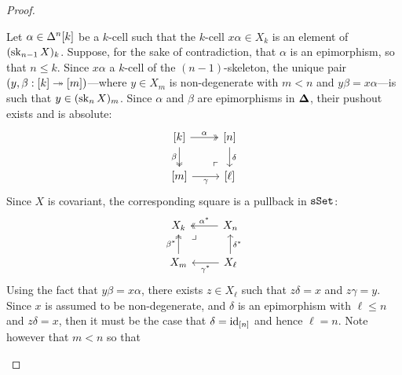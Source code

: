 \begin{proof}
\begin{itemize}
\begin{enumerate}[(i)]
                        Let \(\alpha \in \Delta^n[k]\) be a \(k\)-cell such that the \(k\)-cell
                        \(x \alpha \in X_k\) is an element of \((\operatorname{sk}_{n-1} X)_k\). Suppose, for the
                        sake of contradiction, that \(\alpha\) is an epimorphism, so that
                        \(n \leq k\). Since \(x \alpha\) a \(k\)-cell of the \((n-1)\)-skeleton, the
                        unique pair \((y, \beta: [k] \twoheadrightarrow [m])\)---where \(y \in X_m\) is
                        non-degenerate with \(m < n\) and \(y \beta = x \alpha\)---is such that
                        \(y \in (\operatorname{sk}_n X)_m\). Since \(\alpha\) and \(\beta\) are epimorphisms in
                        \({\mathbf{\Delta}}\), their pushout exists and is absolute:
                        \[
                            \begin{tikzcd}
                                {[k]} \ar[r, "\alpha", two heads]
                                \ar[d, two heads, "\beta"']
                                \ar[dr, phantom, very near end, "\ulcorner"]
                                &{[n]} \ar[d, "\delta"] \\
                                {[m]} \ar[r, "\gamma"']
                                &{[\ell]}
                            \end{tikzcd}
                        \]
                        Since \(X\) is covariant, the corresponding square is a pullback in \({\texttt{sSet}}\):
                        \[
                            \begin{tikzcd}
                                X_k
                                \ar[dr, phantom, very near start, "\lrcorner"]
                                &X_n \ar[l, "\alpha^{*}"', two heads] \\
                                X_m
                                \ar[u, two heads, "\beta^{*}"]
                                &X_{\ell} \ar[l, "\gamma^{*}"]
                                \ar[u, "\delta^{*}"']
                            \end{tikzcd}
                        \]
                        Using the fact that \(y \beta = x \alpha\), there exists \(z \in X_{\ell}\)
                        such that \(z \delta = x\) and \(z \gamma = y\). Since \(x\) is assumed to be
                        non-degenerate, and \(\delta\) is an epimorphism with \(\ell \leq n\) and
                        \(z \delta = x\), then it must be the case that \(\delta = \operatorname{id}_{[n]}\) and
                        hence \(\ell = n\). Note however that \(m < n\) so that

\end{enumerate}
\end{itemize}
\end{proof}
